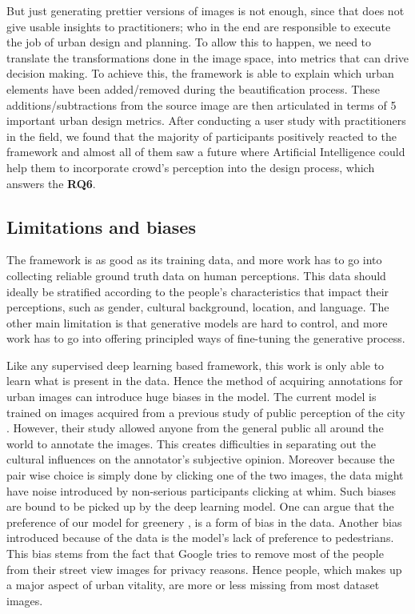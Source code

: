 But just generating prettier versions of images is not enough, since that does not give usable insights to practitioners; who in the end are responsible to execute the job of urban design and planning. To allow this to happen, we need to translate the transformations done in the image space, into metrics that can drive decision making. To achieve this, the framework is able to explain which urban elements have been added/removed during the beautification process. These additions/subtractions from the source image are then articulated in terms of 5 important urban design metrics. After conducting a user study with practitioners in the field, we found that the majority of participants positively reacted to the framework and almost all of them saw a future where Artificial Intelligence could help them to incorporate crowd's perception into the design process, which answers the \textbf{RQ6}.



\subsection{Limitations and biases}
The framework is as good as its training data, and more work has to go into collecting reliable ground truth data on human perceptions. This data should ideally be stratified according to the people's characteristics that impact their perceptions, such as gender, cultural background, location, and language. The other main limitation is that generative models are hard to control, and more work has to go into offering principled ways of fine-tuning the generative process.

Like any supervised deep learning based framework, this work is only able to learn what is present in the data. Hence the method of acquiring annotations  for urban images can introduce huge biases in the model. The current model is trained on images acquired from a previous study of public perception of the city \cite{naik2014streetscore}. However, their study allowed anyone from the general public all around the world to annotate the images. This creates difficulties in separating out the cultural influences on the annotator's subjective opinion. Moreover because the pair wise choice is simply done by clicking one of the two images, the data might have noise introduced by non-serious participants clicking at whim. 
Such biases are bound to be picked up by the deep learning model. One can argue that the preference of our model for greenery , is a form of bias in the data. Another bias introduced because of the data is the model's lack of preference to pedestrians. This bias stems from the fact that Google tries to remove most of the people from their street view images for privacy reasons. Hence people, which makes up a major aspect of urban vitality, are more or less missing from most dataset images.

